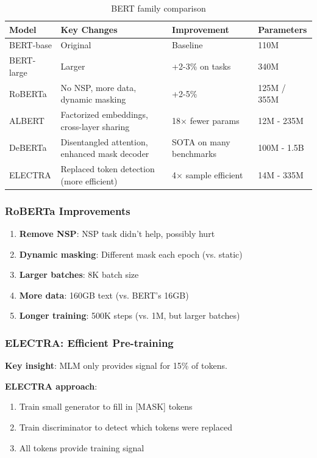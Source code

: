 \begin{table}[H]
\centering
\caption{BERT family comparison}
\begin{tabularx}{\textwidth}{lXXX}
\toprule
\textbf{Model} & \textbf{Key Changes} & \textbf{Improvement} & \textbf{Parameters} \\
\midrule
BERT-base & Original & Baseline & 110M \\
BERT-large & Larger & +2-3\% on tasks & 340M \\
RoBERTa & No NSP, more data, dynamic masking & +2-5\% & 125M / 355M \\
ALBERT & Factorized embeddings, cross-layer sharing & 18× fewer params & 12M - 235M \\
DeBERTa & Disentangled attention, enhanced mask decoder & SOTA on many benchmarks & 100M - 1.5B \\
ELECTRA & Replaced token detection (more efficient) & 4× sample efficient & 14M - 335M \\
\bottomrule
\end{tabularx}
\end{table}

\subsubsection{RoBERTa Improvements}

\begin{enumerate}
    \item \textbf{Remove NSP}: NSP task didn't help, possibly hurt
    \item \textbf{Dynamic masking}: Different mask each epoch (vs. static)
    \item \textbf{Larger batches}: 8K batch size
    \item \textbf{More data}: 160GB text (vs. BERT's 16GB)
    \item \textbf{Longer training}: 500K steps (vs. 1M, but larger batches)
\end{enumerate}

\subsubsection{ELECTRA: Efficient Pre-training}

\textbf{Key insight}: MLM only provides signal for 15\% of tokens.

\textbf{ELECTRA approach}:
\begin{enumerate}
    \item Train small generator to fill in [MASK] tokens
    \item Train discriminator to detect which tokens were replaced
    \item All tokens provide training signal
\end{enumerate}

